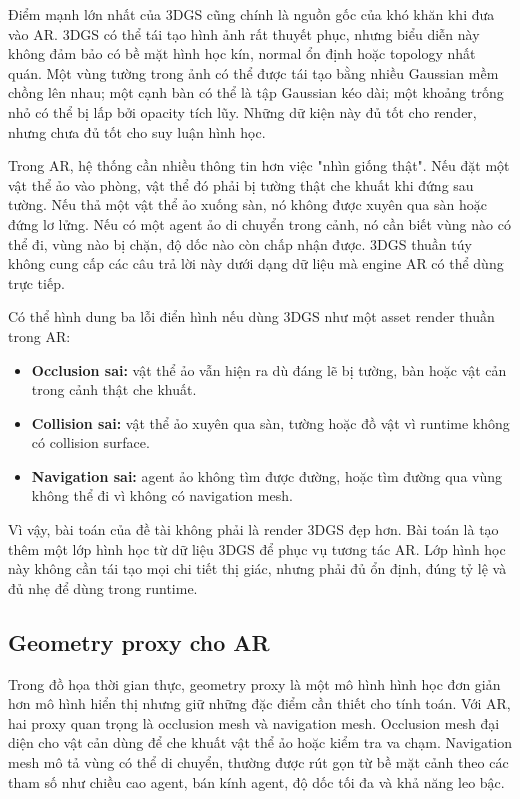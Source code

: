 Điểm mạnh lớn nhất của 3DGS cũng chính là nguồn gốc của khó khăn khi đưa vào AR. 3DGS có thể tái tạo hình ảnh rất thuyết phục, nhưng biểu diễn này không đảm bảo có bề mặt hình học kín, normal ổn định hoặc topology nhất quán. Một vùng tường trong ảnh có thể được tái tạo bằng nhiều Gaussian mềm chồng lên nhau; một cạnh bàn có thể là tập Gaussian kéo dài; một khoảng trống nhỏ có thể bị lấp bởi opacity tích lũy. Những dữ kiện này đủ tốt cho render, nhưng chưa đủ tốt cho suy luận hình học.

Trong AR, hệ thống cần nhiều thông tin hơn việc "nhìn giống thật". Nếu đặt một vật thể ảo vào phòng, vật thể đó phải bị tường thật che khuất khi đứng sau tường. Nếu thả một vật thể ảo xuống sàn, nó không được xuyên qua sàn hoặc đứng lơ lửng. Nếu có một agent ảo di chuyển trong cảnh, nó cần biết vùng nào có thể đi, vùng nào bị chặn, độ dốc nào còn chấp nhận được. 3DGS thuần túy không cung cấp các câu trả lời này dưới dạng dữ liệu mà engine AR có thể dùng trực tiếp.

Có thể hình dung ba lỗi điển hình nếu dùng 3DGS như một asset render thuần trong AR:

\begin{itemize}
  \item \textbf{Occlusion sai:} vật thể ảo vẫn hiện ra dù đáng lẽ bị tường, bàn hoặc vật cản trong cảnh thật che khuất.
  \item \textbf{Collision sai:} vật thể ảo xuyên qua sàn, tường hoặc đồ vật vì runtime không có collision surface.
  \item \textbf{Navigation sai:} agent ảo không tìm được đường, hoặc tìm đường qua vùng không thể đi vì không có navigation mesh.
\end{itemize}

Vì vậy, bài toán của đề tài không phải là render 3DGS đẹp hơn. Bài toán là tạo thêm một lớp hình học từ dữ liệu 3DGS để phục vụ tương tác AR. Lớp hình học này không cần tái tạo mọi chi tiết thị giác, nhưng phải đủ ổn định, đúng tỷ lệ và đủ nhẹ để dùng trong runtime.

\subsection{Geometry proxy cho AR}

Trong đồ họa thời gian thực, geometry proxy là một mô hình hình học đơn giản hơn mô hình hiển thị nhưng giữ những đặc điểm cần thiết cho tính toán. Với AR, hai proxy quan trọng là occlusion mesh và navigation mesh. Occlusion mesh đại diện cho vật cản dùng để che khuất vật thể ảo hoặc kiểm tra va chạm. Navigation mesh mô tả vùng có thể di chuyển, thường được rút gọn từ bề mặt cảnh theo các tham số như chiều cao agent, bán kính agent, độ dốc tối đa và khả năng leo bậc.

